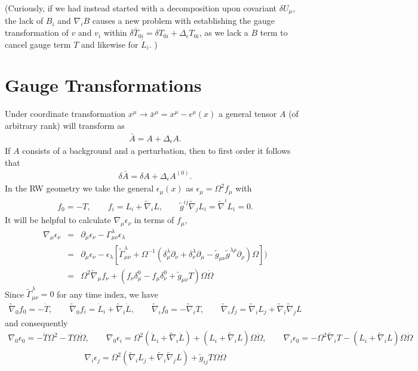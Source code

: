 \documentclass[10pt,letterpaper]{article}
\numberwithin{equation}{section}
\begin{document}
(Curiously, if we had instead started with a decomposition upon covariant $\delta U_\mu$, the lack of $B_i$ and $\nabla_i B$ causes a new problem with establishing the gauge transformation of $v$ and $v_i$ within $\delta \bar T_{0i} = \delta T_{0i} +\Delta_\epsilon T_{0i}$, as we lack a $B$ term to cancel gauge term $T$ and likewise for $\dot L_i$. )
\section{Gauge Transformations}
\label{Gauge Transformations}
Under coordinate transformation $x^\mu \to \bar x^\mu = x^\mu - \epsilon^\mu (x)$ a general tensor $A$ (of arbitrary rank) will transform as
\begin{eqnarray}
\bar A = A + \Delta_\epsilon A.
\end{eqnarray}
If $A$ consists of a background and a perturbation, then to first order it follows that
\begin{eqnarray}
\delta \bar A = \delta A + \Delta_\epsilon A^{(0)}.
\label{plied}
\end{eqnarray}
In the RW geometry we take the general $\epsilon_\mu(x)$ as $\epsilon_\mu = \Omega^2 f_\mu$ with
\begin{eqnarray}
f_0 = -T,\qquad f_i = L_i + \tilde \nabla_i L,\qquad \tilde g^{ij} \tilde\nabla_j L_i = \tilde\nabla^i L_i = 0.
\end{eqnarray}
It will be helpful to calculate $\nabla_\mu \epsilon_\nu$ in terms of $f_\mu$,
\begin{eqnarray}
\nabla_\mu \epsilon_\nu &=& \partial_\mu \epsilon_\nu - \Gamma^\lambda_{\mu\nu} \epsilon_\lambda
\nonumber\\
&=& \partial_\mu \epsilon_\nu - \epsilon_\lambda \left[\tilde \Gamma^{\lambda}_{\mu\nu} + \Omega^{-1}( \delta^\lambda_\mu \partial_\nu +\delta^\lambda_\nu \partial_\mu - \tilde g_{\mu\nu} \tilde g^{\lambda\rho}\partial_\rho)\Omega\right])
\nonumber\\
&=& \Omega^2 \tilde\nabla_\mu f_\nu +  ( f_\nu \delta^0_\mu - f_\mu \delta^0_\nu + \tilde g_{\mu\nu} T) \Omega \dot \Omega
\end{eqnarray}
Since $\tilde\Gamma^{\lambda}_{\mu\nu}=0$ for any time index, we have
\begin{eqnarray}
\tilde\nabla_0 f_0 = -\dot T,\qquad \tilde\nabla_0 f_i = \dot L_i + \tilde\nabla_i \dot L,\qquad \tilde \nabla_i f_0 = -\tilde\nabla_i T,
\qquad \tilde\nabla_i f_j = \tilde\nabla_i L_j + \tilde\nabla_i \tilde\nabla_j L
\end{eqnarray}
and consequently
\begin{eqnarray}
\nabla_0 \epsilon_0 = -\dot T \Omega^2 - T \Omega \dot \Omega,\qquad \nabla_0 \epsilon_i = \Omega^2(\dot L_i + \tilde\nabla_i \dot L) + (L_i + \tilde\nabla_i L)\Omega \dot \Omega,\qquad \nabla_i \epsilon_0 = -\Omega^2 \tilde\nabla_i T - (L_i +\tilde\nabla_i L)\Omega \dot\Omega
\end{eqnarray}
\begin{eqnarray}
\nabla_i \epsilon_j = \Omega^2(\tilde\nabla_i L_j + \tilde\nabla_i\tilde\nabla_j L )+ \tilde g_{ij} T\Omega\dot\Omega
\end{eqnarray}
\end{document}
